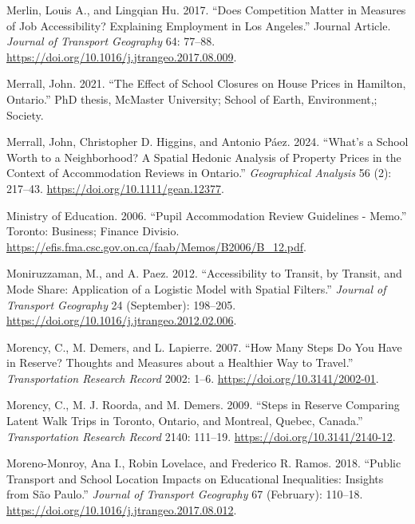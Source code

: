 \documentclass[
default
]{sn-jnl}
\newlength{\cslhangindent}
\newenvironment{CSLReferences}[2] %
 {\begin{list}{}{%
  \setlength{\itemindent}{0pt}
  \setlength{\leftmargin}{0pt}
  \setlength{\parsep}{0pt}
  \ifodd #1
   \setlength{\leftmargin}{\cslhangindent}
   \setlength{\itemindent}{-1\cslhangindent}
  \fi
  \setlength{\itemsep}{#2\baselineskip}}}
 {\end{list}}
\begin{document}
\begin{CSLReferences}{1}{0}
Merlin, Louis A., and Lingqian Hu. 2017. {``Does Competition Matter in
Measures of Job Accessibility? Explaining Employment in Los Angeles.''}
Journal Article. \emph{Journal of Transport Geography} 64: 77--88.
\url{https://doi.org/10.1016/j.jtrangeo.2017.08.009}.

Merrall, John. 2021. {``The Effect of School Closures on House Prices in
Hamilton, Ontario.''} PhD thesis, McMaster University; School of Earth,
Environment,; Society.

Merrall, John, Christopher D. Higgins, and Antonio Páez. 2024. {``What's
a School Worth to a Neighborhood? {A} Spatial Hedonic Analysis of
Property Prices in the Context of Accommodation Reviews in Ontario.''}
\emph{Geographical Analysis} 56 (2): 217--43.
\url{https://doi.org/10.1111/gean.12377}.

Ministry of Education. 2006. {``Pupil Accommodation Review Guidelines -
Memo.''} Toronto: Business; Finance Divisio.
\url{https://efis.fma.csc.gov.on.ca/faab/Memos/B2006/B_12.pdf}.

Moniruzzaman, M., and A. Paez. 2012. {``Accessibility to Transit, by
Transit, and Mode Share: Application of a Logistic Model with Spatial
Filters.''} \emph{Journal of Transport Geography} 24 (September):
198--205. \url{https://doi.org/10.1016/j.jtrangeo.2012.02.006}.

Morency, C., M. Demers, and L. Lapierre. 2007. {``How Many Steps Do You
Have in Reserve? {Thoughts} and Measures about a Healthier Way to
Travel.''} \emph{Transportation Research Record} 2002: 1--6.
\url{https://doi.org/10.3141/2002-01}.

Morency, C., M. J. Roorda, and M. Demers. 2009. {``Steps in {Reserve
Comparing Latent Walk Trips} in {Toronto}, {Ontario}, and {Montreal},
{Quebec}, {Canada}.''} \emph{Transportation Research Record} 2140:
111--19. \url{https://doi.org/10.3141/2140-12}.

Moreno-Monroy, Ana I., Robin Lovelace, and Frederico R. Ramos. 2018.
{``Public Transport and School Location Impacts on Educational
Inequalities: Insights from São Paulo.''} \emph{Journal of Transport
Geography} 67 (February): 110--18.
\url{https://doi.org/10.1016/j.jtrangeo.2017.08.012}.


\end{CSLReferences}
\end{document}
